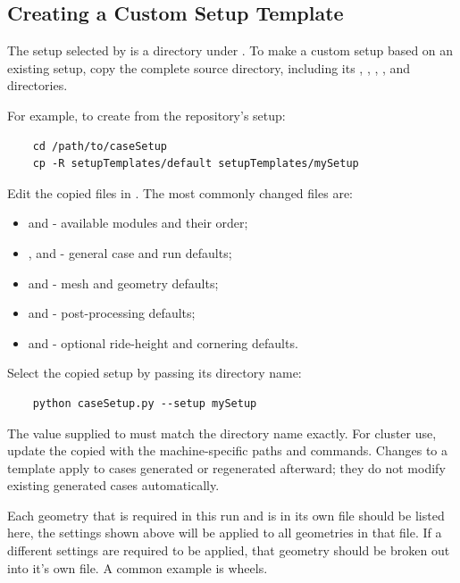 \subsection{Creating a Custom Setup Template}
The setup selected by  is a directory under . To make a custom setup based on an existing setup, copy the complete source directory, including its , , , ,  and  directories.

For example, to create  from the repository's  setup:
\begin{lstlisting}
    cd /path/to/caseSetup
    cp -R setupTemplates/default setupTemplates/mySetup
\end{lstlisting}

Edit the copied files in . The most commonly changed files are:
\begin{itemize}
    \item {} and  - available modules and their order;
    \item {},  and  - general case and run defaults;
    \item {} and  - mesh and geometry defaults;
    \item {} and  - post-processing defaults;
    \item {} and  - optional ride-height and cornering defaults.
\end{itemize}

Select the copied setup by passing its directory name:
\begin{lstlisting}
    python caseSetup.py --setup mySetup
\end{lstlisting}
The value supplied to  must match the directory name exactly. For cluster use, update the copied  with the machine-specific paths and commands. Changes to a template apply to cases generated or regenerated afterward; they do not modify existing generated cases automatically.

Each geometry that is required in this run and is in its own file should be listed here, the settings shown above will be applied to all geometries in that file. If a different settings are required to be applied, that geometry should be broken out into it's own file. A common example is wheels. 

